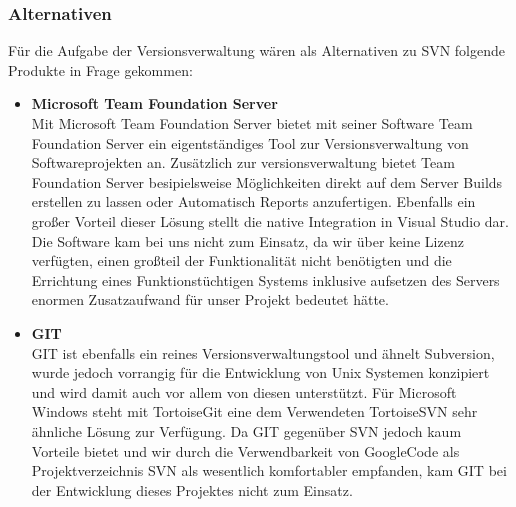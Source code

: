 \subsubsection{Alternativen}
Für die Aufgabe der Versionsverwaltung wären als Alternativen zu SVN folgende Produkte in Frage gekommen:
\begin{itemize}
\item \textbf{Microsoft Team Foundation Server}\\
Mit Microsoft Team Foundation Server bietet mit seiner Software Team Foundation Server ein eigentständiges Tool zur Versionsverwaltung von Softwareprojekten an. 
Zusätzlich zur versionsverwaltung bietet Team Foundation Server besipielsweise  Möglichkeiten direkt auf dem Server Builds erstellen zu lassen oder Automatisch Reports anzufertigen. Ebenfalls ein großer Vorteil dieser Lösung stellt die native Integration in Visual Studio dar. Die Software kam bei uns nicht zum Einsatz, da wir über keine Lizenz verfügten, einen großteil der Funktionalität nicht benötigten und die Errichtung eines Funktionstüchtigen Systems inklusive aufsetzen des Servers enormen Zusatzaufwand für unser Projekt bedeutet hätte.
\item \textbf{GIT}\\
GIT ist ebenfalls ein reines Versionsverwaltungstool und ähnelt Subversion, wurde jedoch vorrangig für die Entwicklung von Unix Systemen konzipiert und wird damit auch vor allem von diesen unterstützt. 
Für Microsoft Windows steht mit TortoiseGit eine dem Verwendeten TortoiseSVN sehr ähnliche Lösung zur Verfügung. Da GIT gegenüber SVN jedoch kaum Vorteile bietet und wir durch die Verwendbarkeit von GoogleCode als Projektverzeichnis SVN als wesentlich komfortabler empfanden, kam GIT bei der Entwicklung dieses Projektes nicht zum Einsatz.
\end{itemize}